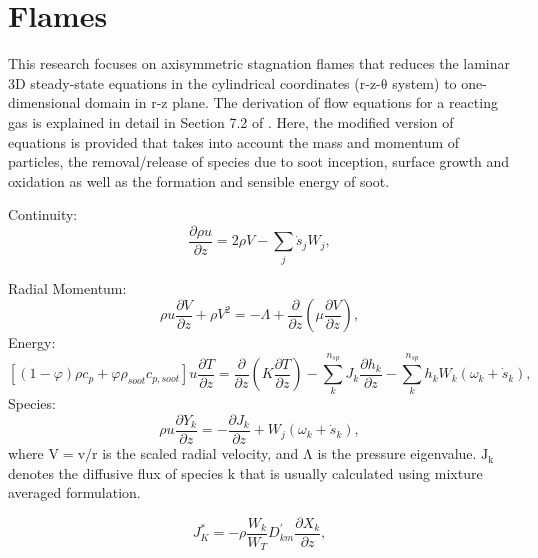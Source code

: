 \section{Flames}
This research focuses on axisymmetric stagnation flames that reduces the laminar 3D steady-state equations in the cylindrical coordinates (r-z-$\mathrm{\theta}$ system) to one-dimensional domain in r-z plane. The derivation of flow equations for a reacting gas is explained in detail in Section 7.2 of \citep{kee2017chemically}. Here, the modified version of equations is provided that takes into account the mass and momentum of particles, the removal/release of species due to soot inception, surface growth and oxidation as well as the formation and sensible energy of soot.

\noindent Continuity:
\begin{equation}
	\frac{\partial \rho u}{\partial z} = 2\rho V - \sum_j \dot{s}_j W_j
	\label{eqn:flame_cont},
\end{equation}

\noindent Radial Momentum:
\begin{equation}
	\rho u\frac{\partial V}{\partial z} + \rho V^2=-\Lambda +
	\frac{\partial}{\partial z}
	\left(
		\mu \frac{\partial V}{\partial z}
	\right)
	\label{eqn:flame_momen},
\end{equation}
\noindent Energy:
\begin{equation}
	\left[
		(1-\varphi)\rho c_p
		+\varphi\rho_{soot} c_{p,soot}
	\right] u
	\frac{\partial T}{\partial z} = 	\frac{\partial}{\partial z}
	\left(
	K \frac{\partial T}{\partial z}
	\right)
	-\sum_{k}^{n_{sp}} J_k \frac{\partial h_k}{\partial z}
	-\sum_{k}^{n_{sp}} h_k W_k
	\left(
		\omega_k+\dot{s}_k
	\right)
	\label{eqn:flame_energy},
\end{equation}
\noindent Species:
\begin{equation}
	\rho u\frac{\partial Y_k}{\partial z} = 
	-\frac{\partial J_k}{\partial z}
	+ W_j 
	\left(
	\omega_k+\dot{s}_k
	\right)
	\label{eqn:flame_species},
\end{equation}
\noindent where $\mathrm{V=v/r}$ is the scaled radial velocity, and $\mathrm{\Lambda}$ is the pressure eigenvalue. $\mathrm{J_k}$ denotes the diffusive flux of species $\mathrm{k}$ that is usually calculated using mixture averaged formulation.

\begin{equation}
	J^*_K = -\rho \frac{W_k}{W_T}D^{'}_{km}
	\frac{\partial X_k}{\partial z}
	\label{eqn:diffflux_star},
\end{equation}

